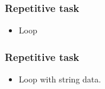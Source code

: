 \begin{frame}[fragile]
\frametitle{Repetitive task}

\begin{itemize}
\item Loop 

\end{itemize}

\end{frame}

\begin{frame}[fragile]
\frametitle{Repetitive task}

\begin{itemize}
\item Loop with string data.

\end{itemize}

\end{frame}